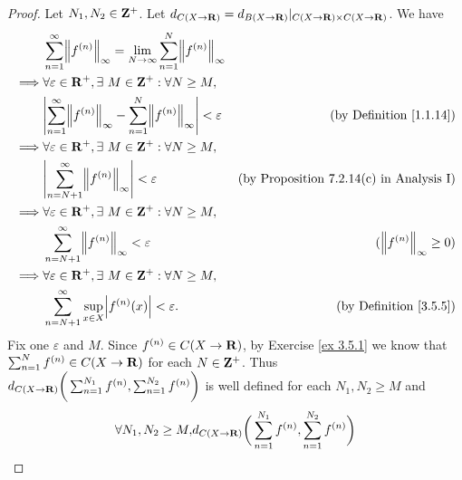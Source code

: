 \begin{proof}
    Let \(N_1, N_2 \in \mathbf{Z}^+\).
    Let \(d_{C(X \to \mathbf{R})} = d_{B(X \to \mathbf{R})}|_{C(X \to \mathbf{R}) \times C(X \to \mathbf{R})}\).
    We have
    \begin{align*}
                 & \sum_{n = 1}^\infty \norm*{f^{(n)}}_\infty = \lim_{N \to \infty} \sum_{n = 1}^N \norm*{f^{(n)}}_\infty                                                   \\
        \implies & \forall \varepsilon \in \R^+, \exists\ M \in \Z^+ : \forall N \geq M,                                                                                    \\
                 & \abs{\sum_{n = 1}^\infty \norm*{f^{(n)}}_\infty - \sum_{n = 1}^N \norm*{f^{(n)}}_\infty} < \varepsilon & \text{(by Definition \ref{1.1.14})}             \\
        \implies & \forall \varepsilon \in \R^+, \exists\ M \in \Z^+ : \forall N \geq M,                                                                                    \\
                 & \abs{\sum_{n = N + 1}^\infty \norm*{f^{(n)}}_\infty} < \varepsilon                                     & \text{(by Proposition 7.2.14(c) in Analysis I)} \\
        \implies & \forall \varepsilon \in \R^+, \exists\ M \in \Z^+ : \forall N \geq M,                                                                                    \\
                 & \sum_{n = N + 1}^\infty \norm*{f^{(n)}}_\infty < \varepsilon                                           & (\norm*{f^{(n)}}_\infty \geq 0)                 \\
        \implies & \forall \varepsilon \in \R^+, \exists\ M \in \Z^+ : \forall N \geq M,                                                                                    \\
                 & \sum_{n = N + 1}^\infty \sup_{x \in X} \abs{f^{(n)}(x)} < \varepsilon.                                 & \text{(by Definition \ref{3.5.5})}
    \end{align*}
    Fix one \(\varepsilon\) and \(M\).
    Since \(f^{(n)} \in C(X \to \mathbf{R})\), by Exercise \ref{ex 3.5.1} we know that \(\sum_{n = 1}^N f^{(n)} \in C(X \to \mathbf{R})\) for each \(N \in \mathbf{Z}^+\).
    Thus \(d_{C(X \to \mathbf{R})}\bigg(\sum_{n = 1}^{N_1} f^{(n)}, \sum_{n = 1}^{N_2} f^{(n)}\bigg)\) is well defined for each \(N_1, N_2 \geq M\) and
    \begin{align*}
        \forall N_1, N_2 \geq M, & d_{C(X \to \R)}\bigg(\sum_{n = 1}^{N_1} f^{(n)}, \sum_{n = 1}^{N_2} f^{(n)}\bigg)                                                    \\

\end{align*}
\end{proof}
